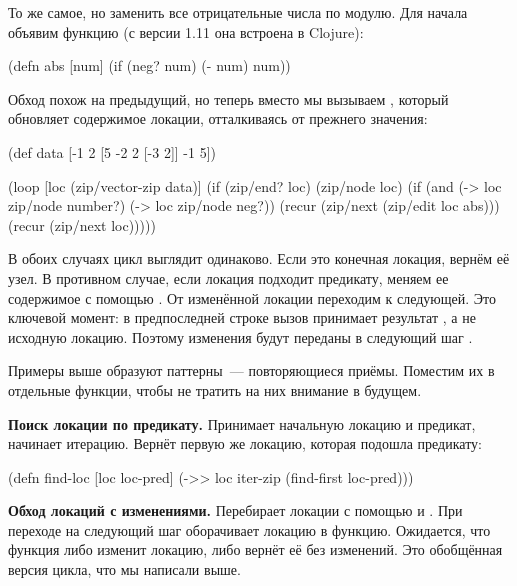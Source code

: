 То же самое, но заменить все отрицательные числа по модулю. Для начала объявим
функцию  (с версии 1.11 она встроена в Clojure):

\begin{english}
  \begin{clojure}
(defn abs [num]
  (if (neg? num)
    (- num)
    num))
  \end{clojure}
\end{english}

Обход похож на предыдущий, но теперь вместо  мы вызываем
, который обновляет содержимое локации, отталкиваясь от прежнего
значения:

\begin{english}
  \begin{clojure}
(def data [-1 2 [5 -2 2 [-3 2]] -1 5])

(loop [loc (zip/vector-zip data)]
  (if (zip/end? loc)
    (zip/node loc)
    (if (and (-> loc zip/node number?)
             (-> loc zip/node neg?))
      (recur (zip/next (zip/edit loc abs)))
      (recur (zip/next loc)))))
  \end{clojure}
\end{english}

В обоих случаях цикл выглядит одинаково. Если это конечная локация, вернём её
узел. В противном случае, если локация подходит предикату, меняем ее содержимое
с помощью . От изменённой локации переходим к следующей. Это ключевой
момент: в предпоследней строке вызов  принимает результат ,
а не исходную локацию. Поэтому изменения будут переданы в следующий шаг .

Примеры выше образуют паттерны~--- повторяющиеся приёмы. Поместим их в отдельные
функции, чтобы не тратить на них внимание в будущем.

\textbf{Поиск локации по предикату.} Принимает начальную локацию и предикат, начинает
итерацию. Вернёт первую же локацию, которая подошла предикату:

\begin{english}
  \begin{clojure}
(defn find-loc [loc loc-pred]
  (->> loc
       iter-zip
       (find-first loc-pred)))
  \end{clojure}
\end{english}

\textbf{Обход локаций с изменениями.} Перебирает локации с помощью  и
. При переходе на следующий шаг оборачивает локацию в
функцию. Ожидается, что функция либо изменит локацию, либо вернёт её без
изменений. Это обобщённая версия цикла, что мы написали выше.

